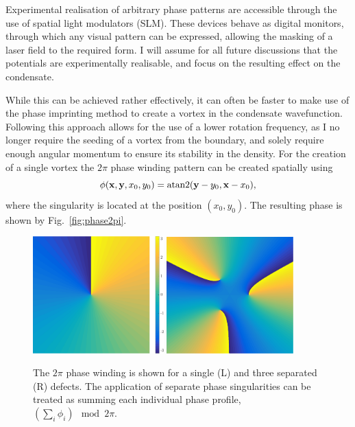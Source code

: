 Experimental realisation of arbitrary phase patterns are accessible through the use of spatial light modulators (SLM). These devices behave as digital monitors, through which any visual pattern can be expressed, allowing the masking of a laser field to the required form. I will assume for all future discussions that the potentials are experimentally realisable, and focus on the resulting effect on the condensate.




 While this can be achieved rather effectively, it can often be faster to make use of the phase imprinting method to create a vortex in the condensate wavefunction. Following this approach allows for the use of a lower rotation frequency, as I no longer require the seeding of a vortex from the boundary, and solely require enough angular momentum to ensure its stability in the density. For the creation of a single vortex the $2\pi$ phase winding pattern can be created spatially using
\begin{equation}
    \phi(\mathbf{x},\mathbf{y},x_0,y_0) = \operatorname*{atan2}(\mathbf{y}-y_0,\mathbf{x}-x_0),
\end{equation}
where the singularity is located at the position $\left(x_0,y_0\right)$. The resulting phase is shown by Fig.~\ref{fig:phase2pi}.
\begin{figure}\centering
    \includegraphics[width=0.45\textwidth]{Images/ch4_vtx/2pi.pdf}
    \includegraphics[width=0.435\textwidth]{Images/ch4_vtx/3_2pi.pdf}
    \caption{The $2\pi$ phase winding is shown for a single (L) and three separated (R) defects. The application of separate phase singularities can be treated as summing each individual phase profile, $\left(\displaystyle\sum\limits_i \phi_i \right) \mod 2\pi$.}\label{fig:atan2phase}
\end{figure}


